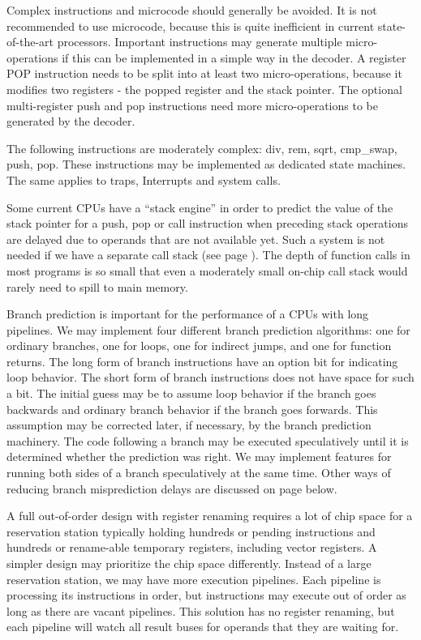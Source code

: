 \documentclass[forwardcom.tex]{subfiles}
\begin{document}
Complex instructions and microcode should generally be avoided. It is not recommended to use microcode, because this is quite inefficient in current state-of-the-art processors. Important instructions may generate multiple micro-operations if this can be implemented in a simple way in the decoder. A register POP instruction needs to be split into at least two micro-operations, because it modifies two registers - the popped register and the stack pointer. The optional multi-register push and pop instructions need more micro-operations to be generated by the decoder. 
\vspace{2mm}

The following instructions are moderately complex: div, rem, sqrt, cmp\_swap, push, pop. These instructions may be implemented as dedicated state machines. The same applies to traps, Interrupts and system calls. 
\vspace{2mm}

Some current CPUs have a ``stack engine'' in order to predict the value of the stack pointer for a push, pop or call instruction when preceding stack operations are delayed due to operands that are not available yet. Such a system is not needed if we have a separate call stack (see page \pageref{dualStack}). The depth of function calls in most programs is so small that even a moderately small on-chip call stack would rarely need to spill to main memory.
\vspace{2mm}

Branch prediction is important for the performance of a CPUs with long pipelines. We may implement four different branch prediction algorithms: one for ordinary branches, one for loops, one for indirect jumps, and one for function returns. The long form of branch instructions have an option bit for indicating loop behavior. The short form of branch instructions does not have space for such a bit. The initial guess may be to assume loop behavior if the branch goes backwards and ordinary branch behavior if the branch goes forwards. This assumption may be corrected later, if necessary, by the branch prediction machinery. The code following a branch may be executed speculatively until it is determined whether the prediction was right. We may implement features for running both sides of a branch speculatively at the same time. Other ways of reducing branch misprediction delays are discussed on page \pageref{branchProposal} below.
\vspace{2mm}

A full out-of-order design with register renaming requires a lot of chip space for a reservation station typically holding hundreds or pending instructions and hundreds or rename-able temporary registers, including vector registers. A simpler design may prioritize the chip space differently. Instead of a large reservation station, we may have more execution pipelines. Each pipeline is processing its instructions in order, but instructions may execute out of order as long as there are vacant pipelines. This solution has no register renaming, but each pipeline will watch all result buses for operands that they are waiting for.
\vspace{2mm}
\end{document}
